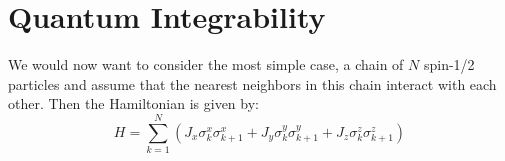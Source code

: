 \documentclass[]{article}
\theoremstyle{definition}
\begin{document}
	 
	
	\section{Quantum Integrability}
	We would now want to consider the most simple case, a chain of $N$ spin-1/2 particles and assume that the nearest neighbors in this chain interact with each other. Then the Hamiltonian is given by: 
	\begin{equation}
		H=\sum_{k=1}^N(J_x\sigma_k^x\sigma_{k+1}^x+J_y\sigma_k^y\sigma_{k+1}^y+J_z\sigma_k^z\sigma_{k+1}^z)
	\end{equation}
	
	\newpage		
	
		
	
\end{document}
